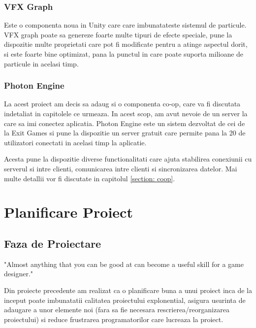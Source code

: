\documentclass[12pt, a4paper]{article}
\begin{document}
	
	
	
	
	\subsubsection{VFX Graph}
	
	Este o componenta noua in Unity care care imbunatateste sistemul de particule. VFX graph poate sa genereze foarte multe tipuri de efecte speciale, pune la dispozitie multe proprietati care pot fi modificate pentru a atinge aspectul dorit, si este foarte bine optimizat, pana la punctul in care poate suporta milioane de particule in acelasi timp.
	
	
	
	
	
	\subsubsection{Photon Engine}
	
	La acest proiect am decis sa adaug si o componenta co-op, care va fi discutata indetaliat in capitolele ce urmeaza. In acest scop, am avut nevoie de un server la care sa imi conectez aplicatia. Photon Engine este un sistem dezvoltat de cei de la Exit Games si pune la dispozitie un server gratuit care permite pana la 20 de utilizatori conectati in acelasi timp la aplicatie.
	\newline
	
	Acesta pune la dispozitie diverse functionalitati care ajuta stabilirea conexiunii cu serverul si intre clienti, comunicarea intre clienti si sincronizarea datelor. Mai multe detallii vor fi discutate in capitolul \ref{section: coop}.
	
	
	
	
	
	\section{Planificare Proiect}
	
	\subsection{Faza de Proiectare}
	
	"Almost anything that you can be good at can become a useful
	skill for a game designer." \cite{bookOfLenses}
	\newline
	
	Din proiecte precedente am realizat ca o planificare buna a unui proiect inca de la inceput poate imbunatatii calitatea proiectului explonential, asigura usurinta de adaugare a unor elemente noi (fara sa fie necesara rescrierea/reorganizarea proiectului) si reduce frustrarea programatorilor care lucreaza la proiect.
	\newline
	
\end{document}
